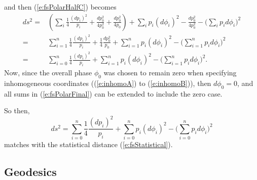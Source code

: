 and then (\ref{e:fsPolarHalfC}) becomes
\begin{equation}
\begin{split}
ds^2 =& 
    \left(
        \sum_i\frac{1}{4}\frac{(dp_i)^2}{p_i}
        + \frac{dp_0^2}{4p_0^2}
        + \frac{dp_0^2}{4p_0}
    \right)
    + \sum_i p_i\left(d\phi_i\right)^2
    - \frac{dp_0^2}{4p_0^2}
    - \biggl(\sum_i p_id\phi_i\biggr)^2\\
  =& 
    \sum_{i=1}^n\frac{1}{4}\frac{(dp_i)^2}{p_i}
    + \frac{1}{4}\frac{dp_0^2}{p_0}
    + \sum_{i=1}^n p_i\left(d\phi_i\right)^2
    - \biggl(\sum_{i=1}^n p_id\phi_i\biggr)^2\\
  =& 
    \sum_{i=0}^n\frac{1}{4}\frac{(dp_i)^2}{p_i}
    + \sum_{i=1}^n p_i\left(d\phi_i\right)^2
    - \biggl(\sum_{i=1}^n p_id\phi_i\biggr)^2.
\end{split}
\label{e:fsPolarFinal}
\end{equation}
Now, since the overall phase $\phi_0$ was chosen to remain 
zero when specifying inhomogeneous coordinates ((\ref{e:inhomoA})
to (\ref{e:inhomoB})), then $d\phi_0 = 0$, and all sums in 
(\ref{e:fsPolarFinal}) can be extended to include the zero case.

So then,
\begin{equation}
ds^2 = \sum_{i=0}^n\frac{1}{4}\frac{(dp_i)^2}{p_i}
    + \sum_{i=0}^n p_i\left(d\phi_i\right)^2
    - \biggl(\sum_{i=0}^n p_id\phi_i\biggr)^2
\end{equation}
matches with the statistical distance (\ref{e:fsStatistical}).

\subsection{Geodesics}

